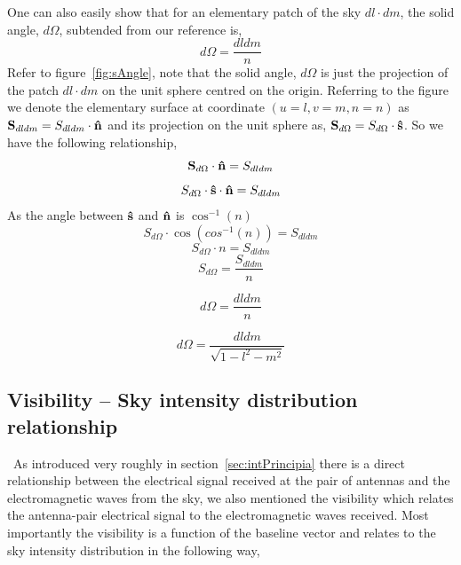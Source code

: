 One can also easily show that for an elementary patch of the sky $dl\cdot{dm}$, the solid angle, $d\Omega$, subtended from our reference is,
\begin{equation}
d\Omega = \frac{dldm}{n}
\end{equation}
Refer to figure~\ref{fig:sAngle}, note that the solid angle, $d\Omega$ is just the projection of the patch $dl\cdot{dm}$ on the unit sphere centred on the origin. Referring to the figure we denote the elementary surface at coordinate $(u= l,v=m,n = n)$ as ${\bf S}_{dldm} ={S}_{dldm}\cdot{\bf \hat{n}} $ and its projection on the unit sphere as, ${\bf S}_{d\Omega} = { S}_{d\Omega}\cdot{\bf \hat{s}}$.
So we have the following relationship,  
\begin{equation}
{\bf S}_{d\Omega}\cdot{\bf \hat{n}} = {S}_{dldm} 
\end{equation}
\begin{equation}
{S}_{d\Omega}\cdot{\bf \hat{s}}\cdot{\bf \hat{n}} = {S}_{dldm} 
\end{equation}
As the angle between ${\bf \hat{s}}$ and ${\bf \hat{n}}$ is ${\cos^{-1}(n)}$ 
\begin{equation}
{S}_{d\Omega}\cdot{\cos(cos^{-1}(n))} = {S}_{dldm} 
\end{equation}
\[
{S}_{d\Omega}\cdot{n} = {S}_{dldm} 
\]
\begin{equation}
{S}_{d\Omega} = \frac{{S}_{dldm}}{n} 
\end{equation}

\[
{d\Omega} = \frac{dldm}{n} 
\]


\begin{equation}
{d\Omega} = \frac{dldm}{\sqrt{1-l^2-m^2}} 
\end{equation}

\subsection{Visibility -- Sky intensity distribution relationship}
\label{sec:intVisInt}
{\citep[From][Sec.~3.1,~Pg.~71-73]{thompson2008interferometry}}~As introduced very roughly in section~\ref{sec:intPrincipia} there is a direct relationship between the electrical signal received at the pair of antennas and the electromagnetic waves from the sky, we also mentioned the visibility which relates the antenna-pair electrical signal to the electromagnetic waves received. Most importantly the visibility is a function of the baseline vector and relates to the sky intensity distribution in the following way,

